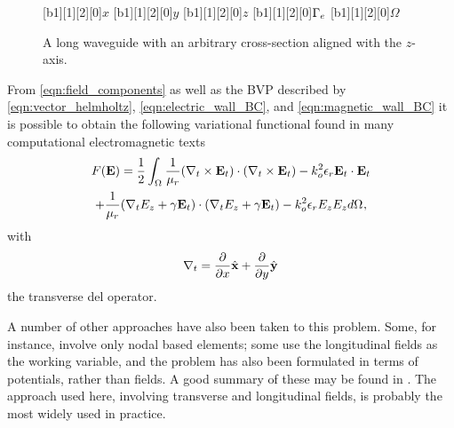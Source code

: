 \begin{figure}
 \centering
 [b1][1][2][0]{$x$}
 [b1][1][2][0]{$y$}
 [b1][1][2][0]{$z$}
 [b1][1][2][0]{$\Gamma_{e}$}
 [b1][1][2][0]{$\Omega$}
 \caption{A long waveguide with an arbitrary cross-section aligned with the $z$-axis.}
 \label{fig:long_waveguide}
\end{figure}

From \eqref{eqn:field_components} as well as the BVP described by
\eqref{eqn:vector_helmholtz}, \eqref{eqn:electric_wall_BC}, and
\eqref{eqn:magnetic_wall_BC} it is possible to obtain the following
variational functional found in many computational electromagnetic
texts
\cite{Jin2002, PelCoc1998}
\begin{multline}
    \label{eqn:functional}
    F(\Ef) = \inv{2}\int_{\Domain{}}\inv{\ur}(\curl{\Ef_t}{t})\cdot(\curl{\Ef_t}{t}) -\ko{o}{2}\er\Ef_t\cdot{\Ef_t}\\
    +\inv{\ur}(\del{E_z}{t} + \gamma\Ef_t)\cdot(\del{E_z}{t} + \gamma\Ef_t)
    -\ko{o}{2}\er E_z{E_z} d\Domain{},
\end{multline}
with 
\begin{equation}
    \nabla_{t}{} = \frac{\partial}{\partial x}\hat{\mathbf{x}} + \frac{\partial}{\partial
    y}\hat{\mathbf{y}}
\end{equation}
the transverse del operator.

A number of other approaches have also been taken to this
problem. Some, for instance, involve only nodal based elements; some
use the longitudinal fields as the working variable, and the problem
has also been formulated in terms of potentials, rather than fields. A
good summary of these may be found in \cite[Chapter
9]{ZhuCan2006}. The approach used here, involving transverse and
longitudinal fields, is probably the most widely used in practice.

